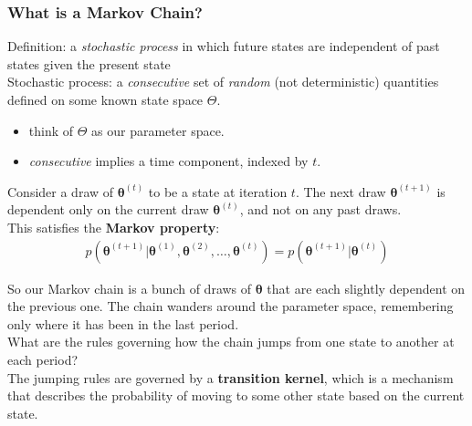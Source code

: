 \documentclass{beamer}
\begin{document}
\begin{frame}
\frametitle{What is a Markov Chain?}
\pause
Definition: a \textit{stochastic process} in which future states are
independent of past states given the present state\\
\bigskip
\pause
Stochastic process: a \textit{consecutive} set of \textit{random} (not
deterministic) quantities defined on some known state space $\Theta$.
\pause
\begin{itemize}
\item think of $\Theta$ as our parameter space.
\pause
\item \textit{consecutive} implies a time component, indexed by $t$.
\end{itemize}
\pause
\bigskip
Consider a draw of $\bm{\theta}^{(t)}$ to be a state at iteration $t$.  The next
draw $\bm{\theta}^{(t+1)}$ is dependent only on the current draw
$\bm{\theta}^{(t)}$, and not on any past draws.\\
\pause 
\bigskip
This satisfies the \textbf{Markov property}:
\pause
\begin{eqnarray*}
p(\bm{\theta}^{(t+1)} | \bm{\theta}^{(1)}, \bm{\theta}^{(2)}, \dots,
\bm{\theta}^{(t)}) = p(\bm{\theta}^{(t+1)} | \bm{\theta}^{(t)})
\end{eqnarray*}
\end{frame}

\begin{frame}
So our Markov chain is a bunch of draws of $\bm{\theta}$ that are each
slightly dependent on the previous one.  \pause The chain wanders
around the parameter space, remembering only where it has been in the
last period.\\
\pause
\bigskip
What are the rules governing how the chain jumps from one state to
another at each period?\\
\pause
\bigskip
The jumping rules are governed by a \textbf{transition kernel}, which
is a mechanism that describes the probability of moving to some other
state based on the current state. 
\end{frame}
\end{document}
